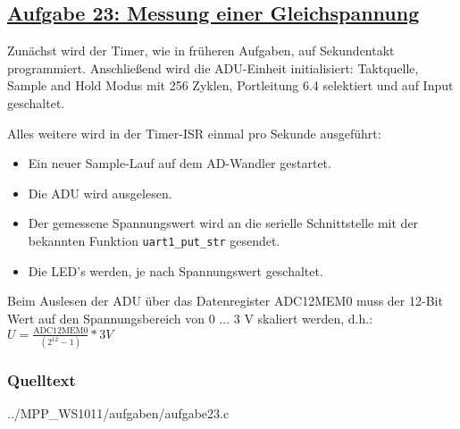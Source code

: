 \subsection
{\href{http://cst.mi.fu-berlin.de/intern/19606-P-MPP/Aufgaben/040801.html}
{Aufgabe 23: Messung einer Gleichspannung}}

Zunächst wird der Timer, wie in früheren Aufgaben, auf Sekundentakt
programmiert. Anschließend wird die ADU-Einheit initialisiert:
Taktquelle, Sample and Hold Modus mit 256 Zyklen, Portleitung 6.4
selektiert und auf Input geschaltet.

Alles weitere wird in der Timer-ISR einmal pro Sekunde ausgeführt:

\begin{itemize}
\item{} Ein neuer Sample-Lauf auf dem AD-Wandler gestartet.
\item{} Die ADU wird ausgelesen.
\item{} Der gemessene Spannungswert wird an die serielle Schnittstelle
  mit der bekannten Funktion {\tt uart1\-\_put\-\_str} gesendet.
\item{} Die LED's werden, je nach Spannungswert geschaltet.
\end{itemize}

Beim Auslesen der ADU über das Datenregister ADC12MEM0 muss der 12-Bit Wert auf den Spannungsbereich
von 0 ... 3 V skaliert werden, d.h.: $U = \frac{\text{ADC12MEM0}}
{(2^{12}-1)}  * 3 V$

\subsubsection*{Quelltext}


{../MPP_WS1011/aufgaben/aufgabe23.c}



